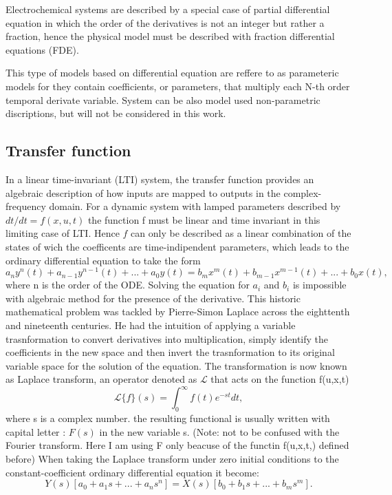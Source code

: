 Electrochemical systems are described by a special case of partial differential equation in which the order of the derivatives is not an integer but rather a fraction, hence the physical model must be described with fraction differential equations (FDE).

This type of models based on differential equation are reffere to as parameteric models for they contain coefficients, or parameters, that multiply each N-th order temporal derivate variable. System can be also model used non-parametric discriptions, but will not be considered in this work.

\subsection{Transfer function}

In a linear time-invariant (LTI) system, the transfer function provides an algebraic description of how inputs are mapped to outputs in the complex-frequency domain. For a dynamic system with lamped parameters described by $dt/dt=f(x,u,t)$ the function f must be linear and time invariant in this limiting case of LTI. Hence $f$ can only be described as a linear combination of the states of wich the coefficents are time-indipendent parameters, which leads to the ordinary differential equation to take the form
$$
a_n y^n (t) + a_{n-1} y^{n-1} (t) + ... + a_0 y(t)  =  b_m x^m (t) + b_{m-1} x^{m-1} (t) + ... + b_0 x(t),  
$$
where n is the order of the ODE.
Solving the equation for $a_i$ and $b_i$ is impossible with algebraic method for the presence of the derivative. This historic mathematical problem was tackled by Pierre-Simon Laplace across the eighttenth and nineteenth centuries. He had the intuition of applying a variable trasnformation to convert derivatives into multiplication, simply identify the coefficients in the new space and then invert the trasnformation to its original variable space for the solution of the equation. The transformation is now known as Laplace transform, an operator denoted as $\mathcal{L}$ that acts on the function f(u,x,t)
$$
\mathcal{L}\{f\}(s) = \int_0^\infty f(t)e^{-st}dt,
$$
where s is a complex number.
the resulting functional is usually written with capital letter : $F(s)$ in the new variable s. (Note: not to be confused with the Fourier transform. Here I am using F only beacuse of the functin f(u,x,t,) defined before)
When taking the Laplace transform under zero initial conditions to the constant-coefficient ordinary differential equation it become: 
$$
Y(s)[a_0 + a_1 s + ... + a_n s^n] = X(s)[b_0 + b_1 s + ... + b_m s^m].  
$$
